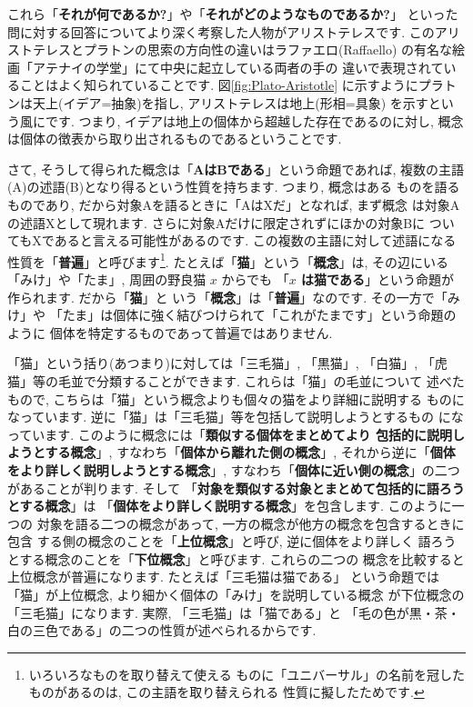 これら「\textbf{それが何であるか?}」や「\textbf{それがどのようなものであるか?}」
といった問に対する回答についてより深く考察した人物がアリストテレスです.
 このアリストテレスとプラトンの思索の方向性の違いはラファエロ(Raffaello)
の有名な絵画「アテナイの学堂」\cite{アテナイ}にて中央に起立している両者の手の
違いで表現されていることはよく知られていることです. 図\ref{fig:Plato-Aristotle}
に示すようにプラトンは天上(イデア=抽象)を指し, アリストテレスは地上(形相=具象)
を示すという風にです. つまり, イデアは地上の個体から超越した存在であるのに対し,
 概念は個体の徴表から取り出されるものであるということです.
\newline

さて, そうして得られた概念は「\textbf{AはBである}」という命題であれば,
 複数の主語(A)の述語(B)となり得るという性質を持ちます. つまり, 概念はある
ものを語るものであり, だから対象Aを語るときに「AはXだ」となれば, まず概念
は対象Aの述語Xとして現れます. さらに対象Aだけに限定されずにほかの対象Bに
ついてもXであると言える可能性があるのです. この複数の主語に対して述語になる
性質を「\textbf{普遍}」と呼びます\footnote{いろいろなものを取り替えて使える
ものに「ユニバーサル」の名前を冠したものがあるのは, この主語を取り替えられる
性質に擬したためです.}. たとえば「\textbf{猫}」という「\textbf{概念}」は,
 その辺にいる「みけ」や「たま」, 周囲の野良猫 $x$ からでも
 「\textbf{$x$ は猫である}」という命題が作られます. だから「\textbf{猫}」と
いう「\textbf{概念}」は「\textbf{普遍}」なのです. その一方で「みけ」や
「たま」は個体に強く結びつけられて「これがたまです」という命題のように
個体を特定するものであって普遍ではありません. 
\newline

「猫」という括り(あつまり)に対しては「三毛猫」, 「黒猫」, 「白猫」,
 「虎猫」等の毛並で分類することができます. これらは「猫」の毛並について
述べたもので, こちらは「猫」という概念よりも個々の猫をより詳細に説明する
ものになっています. 逆に「猫」は「三毛猫」等を包括して説明しようとするもの
になっています. このように概念には「\textbf{類似する個体をまとめてより
包括的に説明しようとする概念}」, すなわち「\textbf{個体から離れた側の概念}」,
 それから逆に「\textbf{個体をより詳しく説明しようとする概念}」, 
 すなわち「\textbf{個体に近い側の概念}」の二つがあることが判ります. そして
「\textbf{対象を類似する対象とまとめて包括的に語ろうとする概念}」は
「\textbf{個体をより詳しく説明する概念}」を包含します. このように一つの
対象を語る二つの概念があって, 一方の概念が他方の概念を包含するときに包含
する側の概念のことを「\textbf{上位概念}」と呼び, 逆に個体をより詳しく
語ろうとする概念のことを「\textbf{下位概念}」と呼びます. これらの二つの
概念を比較すると上位概念が普遍になります. たとえば「三毛猫は猫である」
という命題では「猫」が上位概念, より細かく個体の「みけ」を説明している概念
が下位概念の「三毛猫」になります. 実際, 「三毛猫」は「猫である」と
「毛の色が黒・茶・白の三色である」の二つの性質が述べられるからです.
\newline

